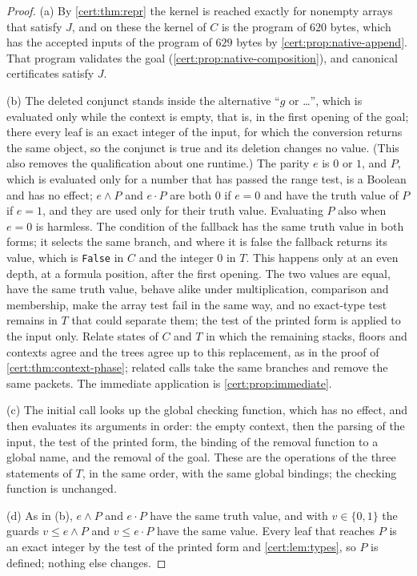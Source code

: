 \begin{proof}
(a) By \cref{cert:thm:repr} the kernel is reached exactly for nonempty arrays
that satisfy $J$, and on these the kernel of $C$ is the program of $620$
bytes, which has the accepted inputs of the program of $629$ bytes by
\cref{cert:prop:native-append}. That program validates the goal
(\cref{cert:prop:native-composition}), and canonical certificates satisfy $J$.

(b) The deleted conjunct stands inside the alternative ``$g$ or \dots'', which
is evaluated only while the context is empty, that is, in the first opening of
the goal; there every leaf is an exact integer of the input, for which the
conversion returns the same object, so the conjunct is true and its deletion
changes no value. (This also removes the qualification about one runtime.) The
parity $e$ is $0$ or $1$, and $P$, which is evaluated only for a number that has
passed the range test, is a Boolean and has no effect; $e\land P$ and $e\cdot P$
are both $0$ if $e=0$ and have the truth value of $P$ if $e=1$, and they are
used only for their truth value. Evaluating $P$ also when $e=0$ is harmless.
The condition of the fallback has the same truth value in both forms; it
selects the same branch, and where it is false the fallback returns its value,
which is \texttt{False} in $C$ and the integer $0$ in $T$. This happens only
at an even depth, at a formula position, after the first opening. The two
values are equal, have the same truth value, behave alike under
multiplication, comparison and membership, make the array test fail in the
same way, and no exact-type test remains in $T$ that could separate them; the
test of the printed form is applied to the input only. Relate states of $C$
and $T$ in which the remaining stacks, floors and contexts agree and the trees
agree up to this replacement, as in the proof of \cref{cert:thm:context-phase};
related calls take the same branches and remove the same packets. The
immediate application is \cref{cert:prop:immediate}.

(c) The initial call looks up the global checking function, which has no
effect, and then evaluates its arguments in order: the empty context, then the
parsing of the input, the test of the printed form, the binding of the removal
function to a global name, and the removal of the goal. These are the
operations of the three statements of $T$, in the same order, with the same
global bindings; the checking function is unchanged.

(d) As in (b), $e\land P$ and $e\cdot P$ have the same truth value, and with
$v\in\{0,1\}$ the guards $v\le e\land P$ and $v\le e\cdot P$ have the same
value. Every leaf that reaches $P$ is an exact integer by the test of the
printed form and \cref{cert:lem:types}, so $P$ is defined; nothing else
changes.
\end{proof}

